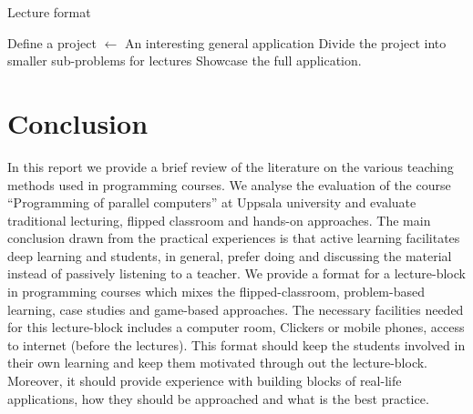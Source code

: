 \documentclass{article}
\begin{document}
\begin{algorithm}
\caption{Lecture format}
\label{alg:lect_form}
\DontPrintSemicolon
Define a project $\longleftarrow$ An interesting general application\;
Divide the project into smaller sub-problems for lectures\;
Showcase the full application.
\end{algorithm}

\section{Conclusion} %
\label{sec:conclusion}

In this report we provide a brief review of the literature on the
various teaching methods used in programming courses.  We analyse the
evaluation of the course ``Programming of parallel computers''
at Uppsala university and evaluate traditional lecturing, flipped
classroom and hands-on approaches.
The main conclusion drawn from the practical experiences
is that active learning facilitates deep learning and students, in
general, prefer doing and discussing the material instead of passively
listening to a teacher.
We provide a format for a lecture-block in programming courses which mixes
the flipped-classroom, problem-based learning, case studies and game-based approaches.
The necessary facilities needed for this lecture-block includes a computer room,
Clickers or mobile phones, access to internet (before the lectures).
This format should keep the students involved in their own learning and keep them
motivated through out the lecture-block. Moreover, it should provide experience with building blocks
of real-life applications, how they should be approached and what is the best practice.



\end{document}
